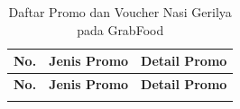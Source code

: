 
\begingroup
\footnotesize
\begin{xltabular}{\textwidth}{|C{0.7cm}|L{3.5cm}|Y|}
\caption{Daftar Promo dan Voucher Nasi Gerilya pada GrabFood}
\label{tab:daftar-promo-nasi-gerilya-grabfood} \\
\toprule
\textbf{No.} & \textbf{Jenis Promo} & \textbf{Detail Promo} \\ \hline
\midrule
\endfirsthead

\toprule
\textbf{No.} & \textbf{Jenis Promo} & \textbf{Detail Promo} \\ \hline
\midrule
\endhead

\endfoot

\bottomrule
\endlastfoot


\end{xltabular}
